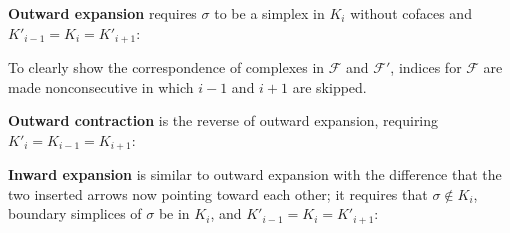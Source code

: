 \documentclass[letterpaper,11pt]{article}
\theoremstyle{mythmstyle}
\theoremstyle{mydefstyle}
\theoremstyle{plain}
\theoremstyle{definition}
\newcommand{\<}[1]{\langle #1\rangle}
\newcommand{\lbarrowspace}{\;}
\newcommand{\inctosp}[1]{\xhookrightarrow{\lbarrowspace#1\lbarrowspace}}
\newcommand{\bakinctosp}[1]{\xhookleftarrow{\lbarrowspace#1\lbarrowspace}}
\newcommand{\Fcal}{\mathcal{F}}
\newcommand{\sG}{\sigma}
\newcommand{\filtcnt}{m}
\begin{document}
\vspace{-1.5em}\noindent


\medskip
\noindent
\textbf{{Outward expansion}}
requires $\sG$ to be a simplex in $K_i$ without cofaces and $K'_{i-1}=K_{i}=K'_{i+1}$:

\vspace{-0.5em}
\begin{center}
\end{center}

\vspace{-1em}\noindent
To clearly show 
the correspondence of complexes in $\Fcal$ and $\Fcal'$, 
indices for $\Fcal$ are made nonconsecutive
in which $i-1$ and $i+1$ are skipped.


\medskip
\noindent
\textbf{{Outward contraction}}
is the reverse of outward expansion, requiring $K'_{i}=K_{i-1}=K_{i+1}$:

\vspace{-1em}
\begin{center}
\end{center}

\vspace{-1em}\noindent



\noindent
\textbf{{Inward expansion}}
is similar to outward expansion with the difference
that the two inserted arrows now pointing toward each other; 
it requires that $\sG\not\in K_i$, boundary simplices of $\sG$ be in $K_i$, and $K'_{i-1}=K_{i}=K'_{i+1}$:
\end{document}
